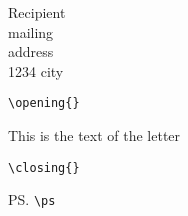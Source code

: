 \documentclass[a4paper,english]{brev}
\begin{document}
\date{\texttt{\textbackslash date\{\}}}
\begin{letter}{Recipient\\mailing\\address\\1234 city}
\opening{\texttt{\textbackslash opening\{\}}}
This is the text of the letter

\closing{\texttt{\textbackslash closing\{\}}}
\ps
\texttt{\textbackslash ps}
\end{letter}
\end{document}
